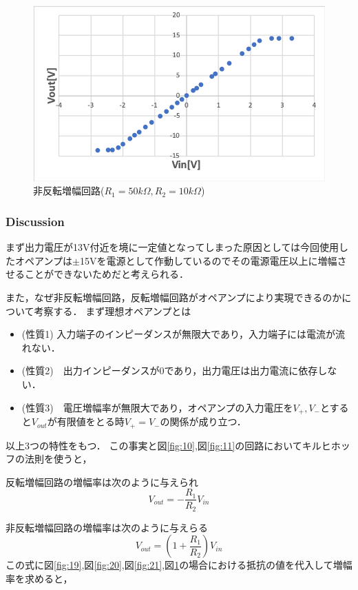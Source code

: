 \documentclass[11pt, a4paper,twocolumn]{jarticle}
\begin{document}
\begin{figure}[htbp]
 \begin{center}
  \includegraphics[width=0.8\linewidth]{fig22.png}
 \end{center}
 \caption{非反転増幅回路($R_1=50k\Omega,R_2=10k\Omega$)}
 \label{fig:22}
\end{figure}

\subsubsection{Discussion}
まず出力電圧が13V付近を境に一定値となってしまった原因としては今回使用したオペアンプは$\pm$15Vを電源として作動しているのでその電源電圧以上に増幅させることができないためだと考えられる．

また，なぜ非反転増幅回路，反転増幅回路がオペアンプにより実現できるのかについて考察する．
まず理想オペアンプとは
\begin{itemize}
    \item (性質1) 入力端子のインピーダンスが無限大であり，入力端子には電流が流れない．
    \item (性質2)　出力インピーダンスが0であり，出力電圧は出力電流に依存しない．
    \item (性質3)　電圧増幅率が無限大であり，オペアンプの入力電圧を$V_+,V_-$とすると$V_{out}$が有限値をとる時$V_+=V_-$の関係が成り立つ．
\end{itemize}
以上3つの特性をもつ．
この事実と図\ref{fig:10},図\ref{fig:11}の回路においてキルヒホッフの法則を使うと，

反転増幅回路の増幅率は次のように与えられ
\begin{equation}
    V_{out} = -\frac{R_1}{R_2}V_{in}
\end{equation}

非反転増幅回路の増幅率は次のように与えらる
\begin{equation}
    V_{out} = \left(1+\frac{R_1}{R_2}\right)V_{in}
\end{equation}
この式に図\ref{fig:19},図\ref{fig:20},図\ref{fig:21},図\ref{fig:22}の場合における抵抗の値を代入して増幅率を求めると，
\end{document}
